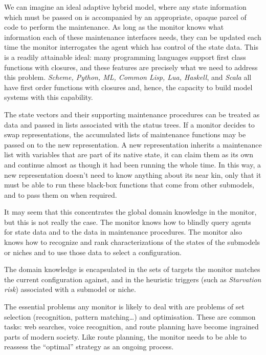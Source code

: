 We can imagine an ideal adaptive hybrid model, where any state
information which must be passed on is accompanied by an appropriate,
opaque parcel of code to perform the maintenance. As long as the
monitor knows what information each of these maintenance interfaces
needs, they can be updated each time the monitor interrogates the
agent which has control of the state data.  This is a readily
attainable ideal: many programming languages support first class
functions with closures, and these features are precisely what we need
to address this problem.  \textsl{Scheme, Python, ML, Common Lisp,
  Lua, Haskell}, and \textsl{Scala} all have first order functions
with closures and, hence, the capacity to build model systems with this
capability.

The state vectors and their supporting maintenance procedures can be
treated as data and passed in lists associated with the status
trees. If a monitor decides to swap rep\-re\-sen\-ta\-tions, the accumulated
lists of maintenance functions may be passed on to the new
rep\-re\-sen\-ta\-tion.  A new rep\-re\-sen\-ta\-tion inherits a maintenance list with
variables that are part of its native state, it can claim them as its
own and continue almost as though it had been running the whole
time. In this way, a new rep\-re\-sen\-ta\-tion doesn't need to know anything
about its near kin, only that it must be able to run these black-box
functions that come from other sub\-models, and to pass them on when
required.

It may seem that this concentrates the global domain knowledge in the
monitor, but this is not really the case.  The monitor knows how to
blindly query agents for state data and to the data in maintenance
procedures. The monitor also knows how to recognize and rank
characterizations of the states of the submodels or niches and to use
those data to select a con\-fig\-ur\-a\-tion.

The domain knowledge is encapsulated in the sets of targets the
monitor matches the current con\-fig\-ur\-a\-tion against, and in the
heuristic triggers (such as \emph{Starvation risk}) associated with a
sub\-model or niche.

The essential problems any monitor is likely to deal with are
problems of set selection (recognition, pattern matching\ldots) and
optimisation.  These are common tasks: web searches, voice
recognition, and route planning have become ingrained parts of modern
society. Like route planning, the monitor needs to be able to reassess
the ``optimal'' strategy as an ongoing process.

